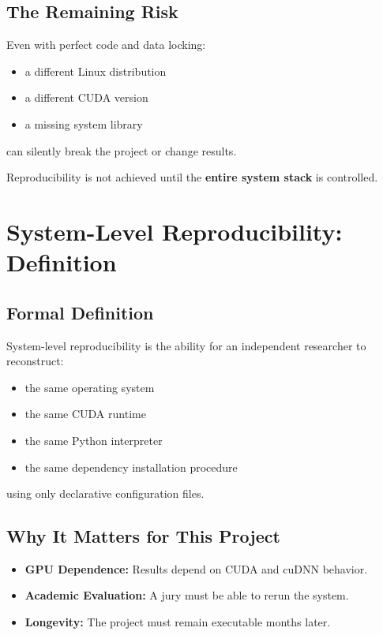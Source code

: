 \documentclass[11pt, a4paper]{article}
\begin{document}
\subsection{The Remaining Risk}
Even with perfect code and data locking:
\begin{itemize}
    \item a different Linux distribution
    \item a different CUDA version
    \item a missing system library
\end{itemize}
can silently break the project or change results.

\begin{tcolorbox}[colback=red!5!white,colframe=red!75!black,title=Key Observation]
Reproducibility is not achieved until the \textbf{entire system stack} is controlled.
\end{tcolorbox}

\section{System-Level Reproducibility: Definition}

\subsection{Formal Definition}
System-level reproducibility is the ability for an independent researcher to reconstruct:
\begin{itemize}
    \item the same operating system
    \item the same CUDA runtime
    \item the same Python interpreter
    \item the same dependency installation procedure
\end{itemize}
using only declarative configuration files.

\subsection{Why It Matters for This Project}
\begin{itemize}
    \item \textbf{GPU Dependence:} Results depend on CUDA and cuDNN behavior.
    \item \textbf{Academic Evaluation:} A jury must be able to rerun the system.
    \item \textbf{Longevity:} The project must remain executable months later.
\end{itemize}
\end{document}
